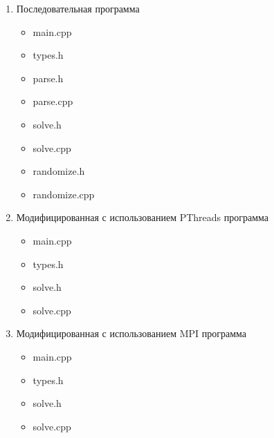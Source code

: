 \begin{enumerate}
\item Последовательная программа
	\begin{itemize}
		\item main.cpp
			
		\item types.h
			
		\item parse.h
			
		\item parse.cpp
			
		\item solve.h
			
		\item solve.cpp
			
		\item randomize.h
			
		\item randomize.cpp
			
	\end{itemize}
	
\item Модифицированная с использованием PThreads программа
	\begin{itemize}
		\item main.cpp
			
		\item types.h
			
		\item solve.h
			
		\item solve.cpp
			
	\end{itemize}
	
\item Модифицированная с использованием MPI программа
	\begin{itemize}
		\item main.cpp
			
		\item types.h
			
		\item solve.h
			
		\item solve.cpp
			
	\end{itemize}
\end{enumerate}

